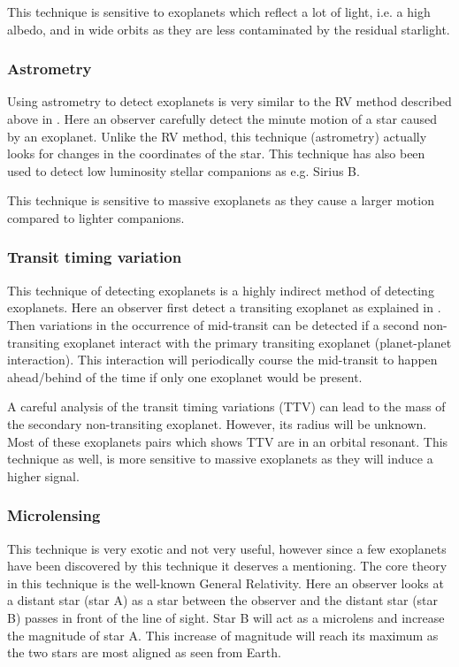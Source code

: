 This technique is sensitive to exoplanets which reflect a lot of light, i.e. a high albedo, and in
wide orbits as they are less contaminated by the residual starlight.

\subsubsection{Astrometry}

Using astrometry to detect exoplanets is very similar to the RV method described above in
. Here an observer carefully detect the minute motion of a star caused by an
exoplanet. Unlike the RV method, this technique (astrometry) actually looks for changes in the
coordinates of the star. This technique has also been used to detect low luminosity stellar
companions as e.g. Sirius B.

This technique is sensitive to massive exoplanets as they cause a larger motion compared to lighter
companions.


\subsubsection{Transit timing variation}

This technique of detecting exoplanets is a highly indirect method of detecting exoplanets. Here an
observer first detect a transiting exoplanet as explained in . Then
variations in the occurrence of mid-transit can be detected if a second non-transiting exoplanet
interact with the primary transiting exoplanet (planet-planet interaction). This interaction will
periodically course the mid-transit to happen ahead/behind of the time if only one exoplanet would
be present.

A careful analysis of the transit timing variations (TTV) can lead to the mass of the secondary
non-transiting exoplanet. However, its radius will be unknown. Most of these exoplanets pairs which
shows TTV are in an orbital resonant. This technique as well, is more sensitive to massive
exoplanets as they will induce a higher signal.


\subsubsection{Microlensing}

This technique is very exotic and not very useful, however since a few exoplanets have been
discovered by this technique it deserves a mentioning. The core theory in this technique is the
well-known General Relativity. Here an observer looks at a distant star (star A) as a star between
the observer and the distant star (star B) passes in front of the line of sight. Star B will act as
a microlens and increase the magnitude of star A. This increase of magnitude will reach its maximum
as the two stars are most aligned as seen from Earth.

